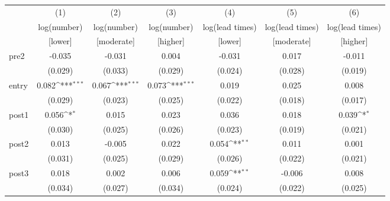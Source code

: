 {
\def\sym#1{\ifmmode^{#1}\else\(^{#1}\)\fi}
\begin{adjustbox}{max width=\textwidth}
\begin{tabular}{l*{6}{c}}
\toprule
            &\multicolumn{1}{c}{(1)}&\multicolumn{1}{c}{(2)}&\multicolumn{1}{c}{(3)}&\multicolumn{1}{c}{(4)}&\multicolumn{1}{c}{(5)}&\multicolumn{1}{c}{(6)}\\
            &\multicolumn{1}{c}{log(number)}&\multicolumn{1}{c}{log(number)}&\multicolumn{1}{c}{log(number)}&\multicolumn{1}{c}{log(lead times)}&\multicolumn{1}{c}{log(lead times)}&\multicolumn{1}{c}{log(lead times)}\\
&[lower]&[moderate]&[higher]&[lower]&[moderate]&[higher]\\
\midrule
pre2        &      -0.035         &      -0.031         &       0.004         &      -0.031         &       0.017         &      -0.011         \\
            &     (0.029)         &     (0.033)         &     (0.029)         &     (0.024)         &     (0.028)         &     (0.019)         \\
\addlinespace
entry       &       0.082\sym{***}&       0.067\sym{***}&       0.073\sym{***}&       0.019         &       0.025         &       0.008         \\
            &     (0.029)         &     (0.023)         &     (0.025)         &     (0.022)         &     (0.018)         &     (0.017)         \\
\addlinespace
post1       &       0.056\sym{*}  &       0.015         &       0.023         &       0.036         &       0.018         &       0.039\sym{*}  \\
            &     (0.030)         &     (0.025)         &     (0.026)         &     (0.023)         &     (0.019)         &     (0.021)         \\
\addlinespace
post2       &       0.013         &      -0.005         &       0.022         &       0.054\sym{**} &       0.011         &       0.001         \\
            &     (0.031)         &     (0.025)         &     (0.029)         &     (0.026)         &     (0.022)         &     (0.021)         \\
\addlinespace
post3       &       0.018         &       0.002         &       0.006         &       0.059\sym{**} &      -0.006         &       0.008         \\
            &     (0.034)         &     (0.027)         &     (0.034)         &     (0.024)         &     (0.022)         &     (0.025)         \\

\end{tabular}
\end{adjustbox}}

